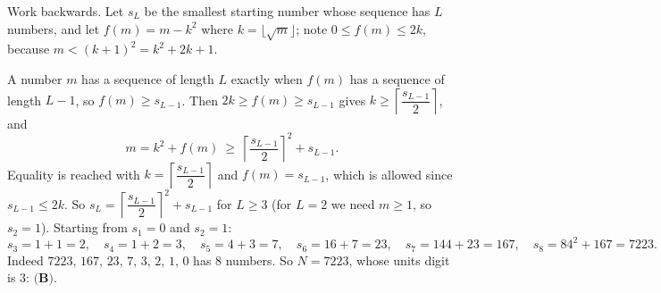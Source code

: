 Work backwards. Let $s_L$ be the smallest starting number whose sequence has $L$ numbers, and let $f(m)=m-k^2$ where $k=\lfloor\sqrt m\rfloor$; note $0\le f(m)\le2k$, because $m<(k+1)^2=k^2+2k+1$.

A number $m$ has a sequence of length $L$ exactly when $f(m)$ has a sequence of length $L-1$, so $f(m)\ge s_{L-1}$. Then $2k\ge f(m)\ge s_{L-1}$ gives $k\ge\left\lceil\dfrac{s_{L-1}}{2}\right\rceil$, and
\[
m=k^2+f(m)\ \ge\ \left\lceil\dfrac{s_{L-1}}{2}\right\rceil^2+s_{L-1}.
\]
Equality is reached with $k=\left\lceil\dfrac{s_{L-1}}{2}\right\rceil$ and $f(m)=s_{L-1}$, which is allowed since $s_{L-1}\le2k$. So $s_L=\left\lceil\dfrac{s_{L-1}}{2}\right\rceil^2+s_{L-1}$ for $L\ge3$ (for $L=2$ we need $m\ge1$, so $s_2=1$). Starting from $s_1=0$ and $s_2=1$:
\[
s_3=1+1=2,\quad s_4=1+2=3,\quad s_5=4+3=7,\quad s_6=16+7=23,\quad s_7=144+23=167,\quad s_8=84^2+167=7223 .
\]
Indeed $7223,\,167,\,23,\,7,\,3,\,2,\,1,\,0$ has $8$ numbers. So $N=7223$, whose units digit is $3$: $\boxed{\textbf{(B)}}$.
